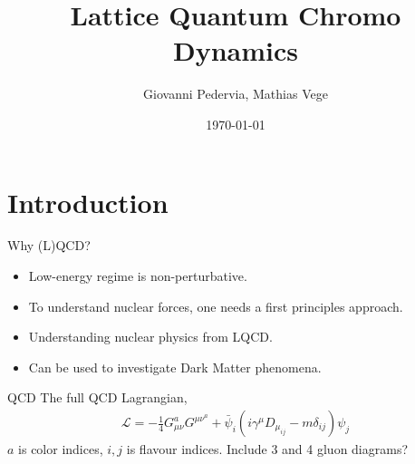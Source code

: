 \documentclass[10pt]{beamer}
\title{Lattice Quantum Chromo Dynamics}
\date{\today}
\author{Giovanni Pedervia, Mathias Vege}
\institute{University of Oslo}
\begin{document}
\maketitle


\section{Introduction}

\begin{frame}{Why (L)QCD?}
	\begin{itemize}%
		\item Low-energy regime is non-perturbative.
		\item To understand nuclear forces, one needs a first principles approach.
		\item Understanding nuclear physics from LQCD.
		\item Can be used to investigate Dark Matter phenomena.
	\end{itemize}
\end{frame}


\begin{frame}{QCD}
	The full QCD Lagrangian,
	\begin{align}
		\mathcal{L} = -\frac{1}{4} G_{\mu\nu}^a G^{\mu\nu}^a + \bar{\psi}_i (i\gamma^{\mu} D_{\mu}_{ij} - m\delta_{ij})\psi_j
	\end{align}
	$a$ is color indices, $i,j$ is flavour indices.
	Include 3 and 4 gluon diagrams?
\end{frame}
\end{document}
